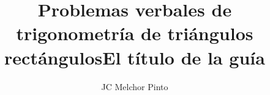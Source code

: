 \documentclass[12pt,addpoints,answers]{guia}
\title{Problemas verbales de trigonometría de triángulos rectángulos}
\title{El título de la guía}
\author{JC Melchor Pinto}
\begin{document}
\pagestyle{headandfoot}

\INFO
\printanswers
\vspace{-0.9cm}
\begin{multicols}{2}
    \columnbreak
\end{multicols}
%
% 
% 
\begin{questions}
    \questionboxed[10]{}
    \questionboxed[10]{}
    \questionboxed[10]{}
    \questionboxed[10]{}
    \questionboxed[10]{}
    \questionboxed[10]{}
    \questionboxed[10]{}
\end{questions}
\end{document}
